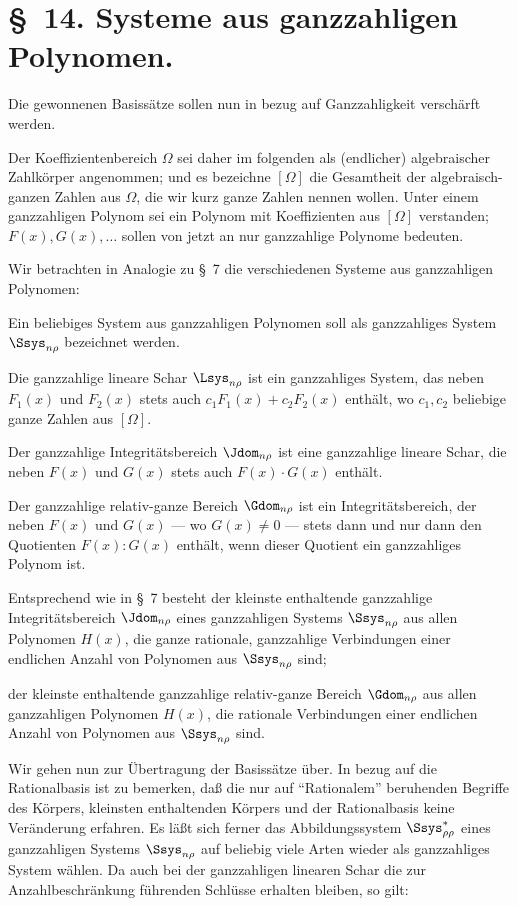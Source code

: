 \documentclass[11pt]{article}
\begin{document}
\section*{\S\ 14. Systeme aus ganzzahligen Polynomen.}

Die gewonnenen Basissätze sollen nun in bezug auf Ganzzahligkeit verschärft werden.

Der Koeffizientenbereich $\Omega$ sei daher im folgenden als (endlicher) algebraischer Zahlkörper angenommen; und es bezeichne $[\Omega]$ die Gesamtheit der algebraisch-ganzen Zahlen aus $\Omega$, die wir kurz ganze Zahlen nennen wollen. Unter einem ganzzahligen Polynom sei ein Polynom mit Koeffizienten aus $[\Omega]$ verstanden; $F(x),G(x),\ldots$ sollen von jetzt an nur ganzzahlige Polynome bedeuten.

Wir betrachten in Analogie zu \S\ 7 die verschiedenen Systeme aus ganzzahligen Polynomen:

Ein beliebiges System aus ganzzahligen Polynomen soll als ganzzahliges System $\Ssys_{n\rho}$ bezeichnet werden.

Die ganzzahlige lineare Schar $\Lsys_{n\rho}$ ist ein ganzzahliges System, das neben $F_1(x)$ und $F_2(x)$ stets auch $c_1F_1(x)+c_2F_2(x)$ enthält, wo $c_1,c_2$ beliebige ganze Zahlen aus $[\Omega]$.

Der ganzzahlige Integritätsbereich $\Jdom_{n\rho}$ ist eine ganzzahlige lineare Schar, die neben $F(x)$ und $G(x)$ stets auch $F(x)\cdot G(x)$ enthält.

Der ganzzahlige relativ-ganze Bereich $\Gdom_{n\rho}$ ist ein Integritätsbereich, der neben $F(x)$ und $G(x)$ --- wo $G(x)\ne0$ --- stets dann und nur dann den Quotienten $F(x):G(x)$ enthält, wenn dieser Quotient ein ganzzahliges Polynom ist.

Entsprechend wie in \S\ 7 besteht der kleinste enthaltende ganzzahlige Integritätsbereich $\Jdom_{n\rho}$ eines ganzzahligen Systems $\Ssys_{n\rho}$ aus allen Polynomen $H(x)$, die ganze rationale, ganzzahlige Verbindungen einer endlichen Anzahl von Polynomen aus $\Ssys_{n\rho}$ sind;

der kleinste enthaltende ganzzahlige relativ-ganze Bereich $\Gdom_{n\rho}$ aus allen ganzzahligen Polynomen $H(x)$, die rationale Verbindungen einer endlichen Anzahl von Polynomen aus $\Ssys_{n\rho}$ sind.

Wir gehen nun zur Übertragung der Basissätze über. In bezug auf die Rationalbasis ist zu bemerken, daß die nur auf ``Rationalem'' beruhenden Begriffe des Körpers, kleinsten enthaltenden Körpers und der Rationalbasis keine Veränderung erfahren. Es läßt sich ferner das Abbildungssystem $\Ssys^*_{\rho\rho}$ eines ganzzahligen Systems $\Ssys_{n\rho}$ auf beliebig viele Arten wieder als ganzzahliges System wählen. Da auch bei der ganzzahligen linearen Schar die zur Anzahlbeschränkung führenden Schlüsse erhalten bleiben, so gilt:
\end{document}
